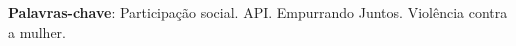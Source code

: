 \begin{resumo}

 \vspace{\onelineskip}
    
 \noindent
 \textbf{Palavras-chave}: Participação social. API. Empurrando Juntos. Violência contra a mulher.
\end{resumo}
